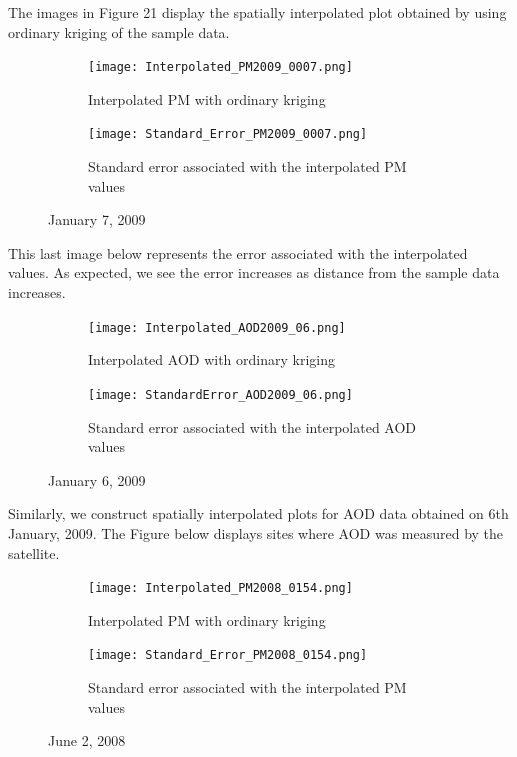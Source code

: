 \documentclass[10pt]{article}
\begin{document}
The images in Figure 21 display the spatially interpolated plot obtained by using ordinary kriging of the sample data.

\begin{figure}[H]
\centering
\begin{subfigure}{.5\textwidth}
  \centering
  \texttt{[image: Interpolated\_PM2009\_0007.png]}
  \caption{ Interpolated PM with ordinary kriging}
\end{subfigure}%
\begin{subfigure}{.5\textwidth}
  \centering
  \texttt{[image: Standard\_Error\_PM2009\_0007.png]}
  \caption{Standard error associated with the interpolated PM values}
\end{subfigure}
\caption{January 7, 2009}
\label{f}
\end{figure}



This last image below represents the error associated with the interpolated values. As expected, we see the error increases as distance from the sample data increases. 

\begin{figure}[H]
\centering
\begin{subfigure}{.5\textwidth}
  \centering
  \texttt{[image: Interpolated\_AOD2009\_06.png]}
  \caption{Interpolated AOD with ordinary kriging}
\end{subfigure}%
\begin{subfigure}{.5\textwidth}
  \centering
  \texttt{[image: StandardError\_AOD2009\_06.png]}
    \caption{Standard error associated with the interpolated AOD values}
\end{subfigure}
\caption{January 6, 2009}
\label{f}
\end{figure}

Similarly, we construct spatially interpolated plots for AOD data obtained on 6th January, 2009. The Figure below displays sites where AOD was measured by the satellite.



\begin{figure}[H]
\centering
\begin{subfigure}{.5\textwidth}
  \centering
  \texttt{[image: Interpolated\_PM2008\_0154.png]}
  \caption{ Interpolated PM with ordinary kriging}
\end{subfigure}%
\begin{subfigure}{.5\textwidth}
  \centering
  \texttt{[image: Standard\_Error\_PM2008\_0154.png]}
  \caption{Standard error associated with the interpolated PM values}
\end{subfigure}
\caption{June 2, 2008}
\label{f}
\end{figure}
\end{document}
